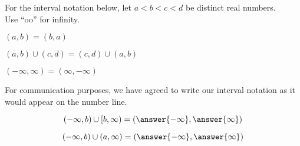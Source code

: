 \documentclass{ximera}
\author{Lee Wayand}
\begin{document}
For the interval notation below, let $a < b < c < d$ be distinct real numbers. \\

Use ``oo'' for infinity. \\


\begin{question}

$(a, b) = (b, a)$

\begin{multipleChoice}
\end{multipleChoice}

\end{question}




\begin{question}

$(a, b) \cup (c, d) = (c, d) \cup (a, b)$

\begin{multipleChoice}
\end{multipleChoice}

\end{question}





\begin{question}

$(-\infty, \infty) = (\infty, -\infty)$

\begin{multipleChoice}
\end{multipleChoice}
\begin{feedback}[correct]
For communication purposes, we have agreed to write our interval notation as it would appear on the number line.
\end{feedback}
\end{question}






\begin{question}
\[
(-\infty, b) \cup [b, \infty) = \left( \answer{-\infty}, \answer{\infty} \right)
\]
\end{question}







\begin{question}
\[
(-\infty, b) \cup (a, \infty) = \left( \answer{-\infty}, \answer{\infty} \right)
\]
\end{question}
\end{document}
